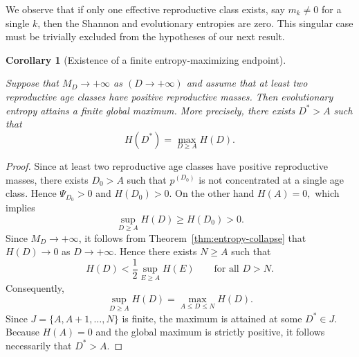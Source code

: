 \documentclass[10pt,a4paper]{amsart}
\newtheorem{cor}[thm]{Corollary}
\theoremstyle{definition}
\theoremstyle{remark}
\numberwithin{equation}{section}
\begin{document}
We observe that if only one effective reproductive class exists,
say \(m_k\neq0\) for a single \(k\), then the Shannon and evolutionary entropies are
zero. This singular case must be trivially excluded from the hypotheses of our next result.

\begin{cor}[Existence of a finite entropy-maximizing endpoint]
\label{cor:finite-maximizer}

Suppose that
$
M_D\to+\infty$
as $
(D\to+\infty)
$
and assume that at least two reproductive age classes have positive reproductive masses.
Then evolutionary entropy attains a finite global maximum. 
More precisely, there exists
$
D^\ast>A
$
such that
\[
H(D^\ast)
=
\max_{D\geq A}H(D).
\]

\end{cor}

\begin{proof}

Since at least two reproductive age classes have positive
reproductive masses, there exists \(D_0>A\)
such that \(p^{(D_0)}\) is not concentrated at a single age class.
Hence $
\Psi_{D_0}>0$ and $
H(D_0)>0.$
On the other hand
$
H(A)=0,
$ which implies
\[
\sup_{D\geq A}H(D) \geq H(D_0) >0.
\]
Since $M_D\to+\infty$, it follows from 
Theorem~\ref{thm:entropy-collapse} that 
$
H(D)\to0$ as 
$D\to+\infty.$
Hence there exists \(N\geq A\) such that
\[
H(D)
<
\frac12
\sup_{E\geq A}H(E)
\qquad
\text{for all }
D>N.
\]
Consequently,
\[
\sup_{D\geq A}H(D)
=
\max_{A\leq D\leq N}H(D).
\]
Since
$
J = \{A,A+1,\ldots,N\} $
is finite, the maximum is attained at some  \(D^\ast \in J \).
Because \(H(A)=0\) and the global maximum is strictly positive,
it follows necessarily that $
D^\ast>A.
$

\end{proof}
\end{document}
